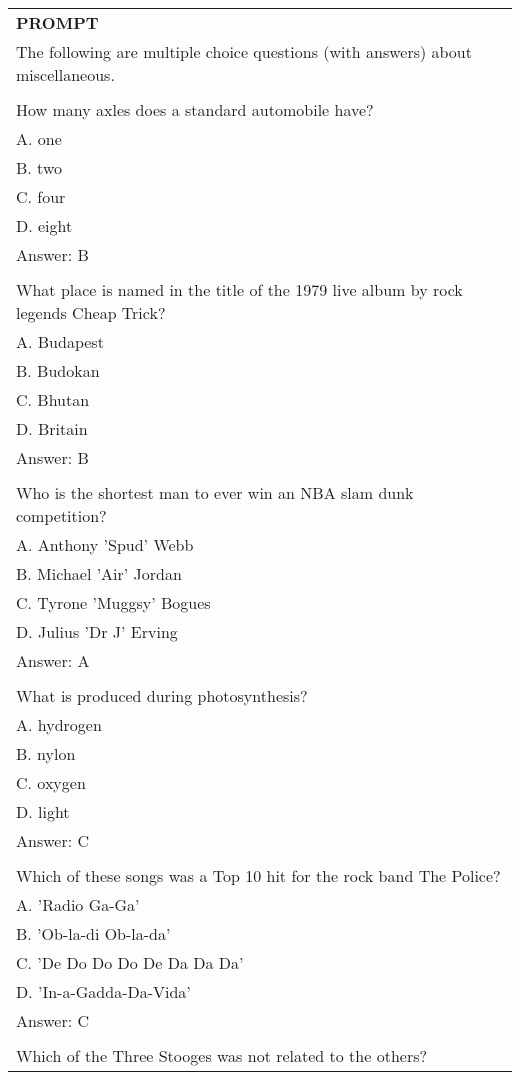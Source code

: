 \begin{table}[ht]
    \centering \small
\begin{tabular}{p{12cm}}
\toprule
\textbf{PROMPT}\\

The following are multiple choice questions (with answers) about miscellaneous.\\
\\
How many axles does a standard automobile have?\\
A. one\\
B. two\\
C. four\\
D. eight\\
Answer: B\\
\\
What place is named in the title of the 1979 live album by rock legends Cheap Trick?\\
A. Budapest\\
B. Budokan\\
C. Bhutan\\
D. Britain\\
Answer: B\\
\\
Who is the shortest man to ever win an NBA slam dunk competition?\\
A. Anthony 'Spud' Webb\\
B. Michael 'Air' Jordan\\
C. Tyrone 'Muggsy' Bogues\\
D. Julius 'Dr J' Erving\\
Answer: A\\
\\
What is produced during photosynthesis?\\
A. hydrogen\\
B. nylon\\
C. oxygen\\
D. light\\
Answer: C\\
\\
Which of these songs was a Top 10 hit for the rock band The Police?\\
A. 'Radio Ga-Ga'\\
B. 'Ob-la-di Ob-la-da'\\
C. 'De Do Do Do De Da Da Da'\\
D. 'In-a-Gadda-Da-Vida'\\
Answer: C\\
\\
Which of the Three Stooges was not related to the others?\\

\end{tabular}
\end{table}
